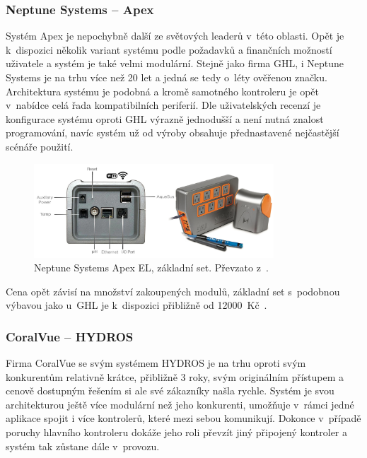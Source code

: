         \subsubsection{Neptune Systems -- Apex}
            Systém Apex je nepochybně další ze světových leaderů v~této oblasti. Opět je k~dispozici několik variant systému podle požadavků a finančních možností uživatele a systém je také velmi modulární. Stejně jako firma GHL, i Neptune Systems je na trhu více než 20 let a jedná se tedy o~léty ověřenou značku. Architektura systému je podobná a kromě samotného kontroleru je opět v~nabídce celá řada kompatibilních periferií. Dle uživatelských recenzí je konfigurace systému oproti GHL výrazně jednodušší a není nutná znalost programování, navíc systém už od výroby obsahuje přednastavené nejčastější scénáře použití.

            \begin{figure}[h!]
                \centering
                \includegraphics[width=0.8\textwidth]{obrazky/trh/apex-el.jpg}
                \caption{Neptune Systems Apex EL, základní set. Převzato z~\cite{eshop-neptune-systems-apex}.}
                \label{fig:obrazky-trh-apex-el}
            \end{figure}
            
            Cena opět závisí na množství zakoupených modulů, základní set s~podobnou výbavou jako u~GHL je k~dispozici přibližně od \qty{12000}{Kč}~\cite{neptune-systems-why-apex,eshop-neptune-systems-apex}.

        \subsubsection{CoralVue -- HYDROS}
            Firma CoralVue se svým systémem HYDROS je na trhu oproti svým konkurentům relativně krátce, přibližně 3 roky, svým originálním přístupem a cenově dostupným řešením si ale své zákazníky našla rychle. Systém je svou architekturou ještě více modulární než jeho konkurenti, umožňuje v~rámci jedné aplikace spojit i více kontrolerů, které mezi sebou komunikují. Dokonce v~případě poruchy hlavního kontroleru dokáže jeho roli převzít jiný připojený kontroler a systém tak zůstane dále v~provozu. 
            
